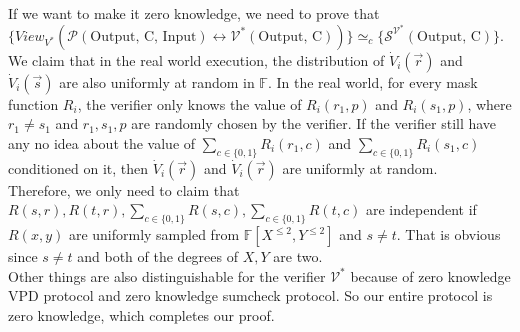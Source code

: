 If we want to make it zero knowledge, we need to prove that $\{View_{V^*}(\mathcal{P}(\text{Output, C, Input}) \leftrightarrow \mathcal{V^*}(\text{Output, C}))\} \simeq_{c} \{\mathcal{S}^{\mathcal{V^*}}(\text{Output, C})\}$. We claim that in the real world execution, the distribution of $\dot{V}_i(\vec{r})$ and $\dot{V}_i(\vec{s})$ are also uniformly at random in $\mathbb{F}$. In the real world, for every mask function $R_i$, the verifier only knows the value of $R_i(r_1, p)$ and $R_i(s_1, p)$, where $r_1 \neq s_1$ and $r_1, s_1, p$ are randomly chosen by the verifier. If the verifier still have any no idea about the value of $\sum\limits_{c \in \{0, 1\}}R_i(r_1, c)$ and $\sum\limits_{c \in \{0, 1\}}R_i(s_1, c)$ conditioned on it, then $\dot{V}_i(\vec{r})$ and $\dot{V}_i(\vec{r})$ are uniformly at random.\\

Therefore, we only need to claim that $R(s, r), R(t, r), \sum\limits_{c \in \{0, 1\}}R(s, c), \sum\limits_{c \in \{0, 1\}}R(t, c)$ are independent if $R(x, y)$ are uniformly sampled from $\mathbb{F}[X^{\leqslant 2}, Y^{\leqslant 2}]$ and $s \neq t$. That is obvious since $s \neq t$ and both of the degrees of $X, Y$ are two. \\

Other things are also distinguishable for the verifier $\mathcal{V^*}$ because of zero knowledge VPD protocol and zero knowledge sumcheck protocol. So our entire protocol is zero knowledge, which completes our proof.   
























